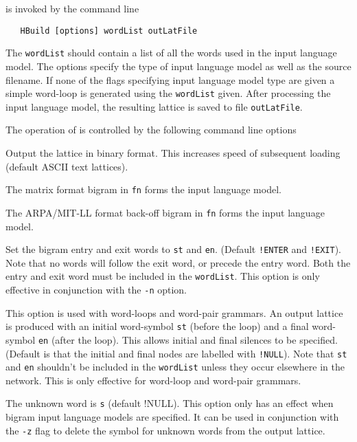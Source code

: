 
 is invoked by the command line
\begin{verbatim}
   HBuild [options] wordList outLatFile
\end{verbatim}
The {\tt wordList} should contain a list of all the words used
in the input language model. The options specify the type of input
language model as well as the source filename. If none of the flags
specifying input language model type are given a simple word-loop
is generated using the {\tt wordList} given. After processing the
input language model, the resulting lattice
is saved to file {\tt outLatFile}.

The operation of  is controlled by the following
command line options
\begin{optlist}
   Output the lattice in binary format. This increases
              speed of subsequent loading (default ASCII text lattices).

   The matrix format bigram in {\tt fn} forms the input
              language model.

   The ARPA/MIT-LL format back-off bigram in {\tt fn} 
              forms the input language model.

   Set the bigram entry and exit words to {\tt st} 
        and {\tt en}.  (Default {\tt !ENTER} and {\tt !EXIT}).
        Note that no words will follow the exit word, or precede
        the entry word. Both the entry and exit word must be included
        in the {\tt wordList}. This option is only effective in conjunction
          with the \texttt{-n} option.

   This option is used with word-loops and word-pair 
        grammars.
        An output lattice is produced with an initial word-symbol
        {\tt st} (before the loop) and a final word-symbol {\tt en}
        (after the loop). This allows initial and final silences
        to be specified. (Default is that the initial and final nodes
        are labelled with {\tt !NULL}). Note that {\tt st} and {\tt en} 
        shouldn't be included in the {\tt wordList} unless they occur 
        elsewhere in the network. This is only effective for word-loop and
          word-pair grammars.

   The unknown word is {\tt s} (default !NULL). This
         option only has an effect when bigram input language models 
         are specified. It can be used in conjunction with the {\tt -z}
         flag to delete the symbol for unknown words from the output
         lattice.


\end{optlist}
